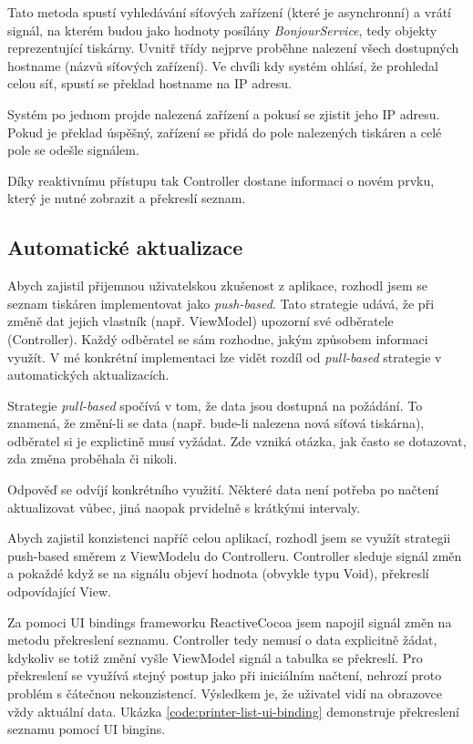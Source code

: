 Tato metoda spustí vyhledávání síťových zařízení (které je asynchronní) a vrátí signál, na kterém budou jako hodnoty posílány \textit{BonjourService}, tedy objekty reprezentující tiskárny.
Uvnitř třídy nejprve proběhne nalezení všech dostupných hostname (názvů síťových zařízení).
Ve chvíli kdy systém ohlásí, že prohledal celou síť, spustí se překlad hostname na IP adresu.

Systém po jednom projde nalezená zařízení a pokusí se zjistit jeho IP adresu.
Pokud je překlad úspěšný, zařízení se přidá do pole nalezených tiskáren a celé pole se odešle signálem.

Díky reaktivnímu přístupu tak Controller dostane informaci o novém prvku, který je nutné zobrazit a překreslí seznam.

\subsection{Automatické aktualizace}

Abych zajistil přijemnou uživatelskou zkušenost z aplikace, rozhodl jsem se seznam tiskáren implementovat jako \textit{push-based}.
Tato strategie udává, že při změně dat jejich vlastník (např. ViewModel) upozorní své odběratele (Controller).
Každý odběratel se sám rozhodne, jakým způsobem informaci využít.
V mé konkrétní implementaci lze vidět rozdíl od \textit{pull-based} strategie v automatických aktualizacích.

Strategie \textit{pull-based} spočívá v tom, že data jsou dostupná na požádání.
To znamená, že změní-li se data (např. bude-li nalezena nová síťová tiskárna), odběratel si je explictině musí vyžádat.
Zde vzniká otázka, jak často se dotazovat, zda změna proběhala či nikoli.

Odpověď se odvíjí konkrétního využití.
Některé data není potřeba po načtení aktualizovat vůbec, jiná naopak prvidelně s krátkými intervaly.

\bigskip

Abych zajistil konzistenci napříč celou aplikací, rozhodl jsem se využít strategii push-based směrem z ViewModelu do Controlleru.
Controller sleduje signál změn a pokaždé když se na signálu objeví hodnota (obvykle typu Void), překreslí odpovídající View.

Za pomoci UI bindings frameworku ReactiveCocoa jsem napojil signál změn na metodu překreslení seznamu.
Controller tedy nemusí o data explicitně žádat, kdykoliv se totiž změní vyšle ViewModel signál a tabulka se překreslí.
Pro překreslení se využívá stejný postup jako při iniciálním načtení, nehrozí proto problém s čátečnou nekonzistencí.
Výsledkem je, že uživatel vidí na obrazovce vždy aktuální data.
Ukázka \ref{code:printer-list-ui-binding} demonstruje překreslení seznamu pomocí UI bingins.

